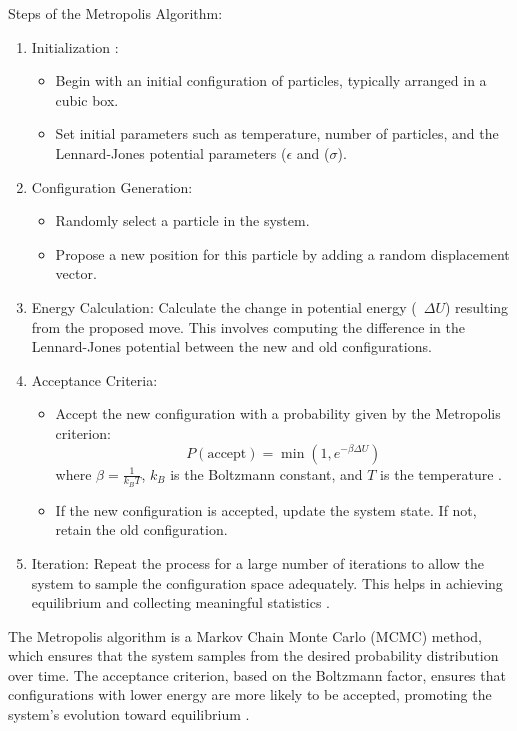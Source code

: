 \documentclass[a4paper,12pt]{article}
\begin{document}
 Steps of the Metropolis Algorithm:
\begin{multicols}{2}
\begin{enumerate}
    \item   Initialization :
   \begin{itemize}
       \item Begin with an initial configuration of particles, typically arranged in a cubic box.
       \item  Set initial parameters such as temperature, number of particles, and the Lennard-Jones potential parameters (\(\epsilon\) and ($\sigma$).
   \end{itemize} 
   \item   Configuration Generation:
   \begin{itemize}
       \item Randomly select a particle in the system.
   \item Propose a new position for this particle by adding a random displacement vector. 
   \end{itemize}
   \item Energy Calculation:
    Calculate the change in potential energy (\ $\Delta U$) resulting from the proposed move. This involves computing the difference in the Lennard-Jones potential between the new and old configurations.
\item   Acceptance Criteria:
   \begin{itemize}
       \item   Accept the new configuration with a probability given by the Metropolis criterion:
     \[
     P(\text{accept}) = \min\left(1, e^{-\beta \Delta U}\right)
     \]
     where \(\beta = \frac{1}{k_B T}\), \(k_B\) is the Boltzmann constant, and \(T\) is the temperature \cite{msse2022}.
   \item If the new configuration is accepted, update the system state. If not, retain the old configuration.

   \end{itemize}

\item Iteration:
    Repeat the process for a large number of iterations to allow the system to sample the configuration space adequately. This helps in achieving equilibrium and collecting meaningful statistics \cite{Gould2006}.






\end{enumerate}
The Metropolis algorithm is a Markov Chain Monte Carlo (MCMC) method, which ensures that the system samples from the desired probability distribution over time. The acceptance criterion, based on the Boltzmann factor, ensures that configurations with lower energy are more likely to be accepted, promoting the system's evolution toward equilibrium \cite{Stephens2024}.
 \end{multicols}
 
\end{document}
